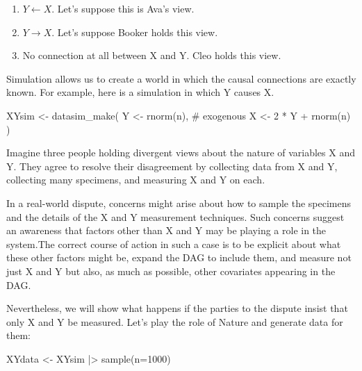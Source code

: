 \documentclass[
  letterpaper,
  DIV=11,
  numbers=noendperiod,
  oneside]{scrartcl}
\newenvironment{Shaded}{\begin{snugshade}}{\end{snugshade}}
\newcommand{\AttributeTok}[1]{\textcolor[rgb]{0.40,0.45,0.13}{#1}}
\newcommand{\CommentTok}[1]{\textcolor[rgb]{0.37,0.37,0.37}{#1}}
\newcommand{\DecValTok}[1]{\textcolor[rgb]{0.68,0.00,0.00}{#1}}
\newcommand{\FunctionTok}[1]{\textcolor[rgb]{0.28,0.35,0.67}{#1}}
\newcommand{\NormalTok}[1]{\textcolor[rgb]{0.00,0.23,0.31}{#1}}
\newcommand{\OtherTok}[1]{\textcolor[rgb]{0.00,0.23,0.31}{#1}}
\newcommand{\SpecialCharTok}[1]{\textcolor[rgb]{0.37,0.37,0.37}{#1}}
\providecommand{\tightlist}{%
  \setlength{\itemsep}{0pt}\setlength{\parskip}{0pt}}\usepackage{longtable,booktabs,array}
\begin{document}
\begin{enumerate}
\def\labelenumi{\roman{enumi}.}
\tightlist
\item
  \(Y \leftarrow X\). Let's suppose this is Ava's view.
\item
  \(Y \rightarrow X\). Let's suppose Booker holds this view.
\item
  No connection at all between X and Y. Cleo holds this view.
\end{enumerate}

Simulation allows us to create a world in which the causal connections
are exactly known. For example, here is a simulation in which Y causes
X.

\begin{Shaded}
\begin{Highlighting}[]
\NormalTok{XYsim }\OtherTok{\textless{}{-}} \FunctionTok{datasim\_make}\NormalTok{(}
\NormalTok{  Y }\OtherTok{\textless{}{-}} \FunctionTok{rnorm}\NormalTok{(n), }\CommentTok{\# exogenous}
\NormalTok{  X }\OtherTok{\textless{}{-}} \DecValTok{2} \SpecialCharTok{*}\NormalTok{ Y }\SpecialCharTok{+} \FunctionTok{rnorm}\NormalTok{(n)}
\NormalTok{)}
\end{Highlighting}
\end{Shaded}

Imagine three people holding divergent views about the nature of
variables X and Y. They agree to resolve their disagreement by
collecting data from X and Y, collecting many specimens, and measuring X
and Y on each.

In a real-world dispute, concerns might arise about how to sample the
specimens and the details of the X and Y measurement techniques. Such
concerns suggest an awareness that factors other than X and Y may be
playing a role in the system.The correct course of action in such a case
is to be explicit about what these other factors might be, expand the
DAG to include them, and measure not just X and Y but also, as much as
possible, other covariates appearing in the DAG.

Nevertheless, we will show what happens if the parties to the dispute
insist that only X and Y be measured. Let's play the role of Nature and
generate data for them:

\begin{Shaded}
\begin{Highlighting}[]
\NormalTok{XYdata }\OtherTok{\textless{}{-}}\NormalTok{ XYsim }\SpecialCharTok{|\textgreater{}} \FunctionTok{sample}\NormalTok{(}\AttributeTok{n=}\DecValTok{1000}\NormalTok{)}
\end{Highlighting}
\end{Shaded}
\end{document}
